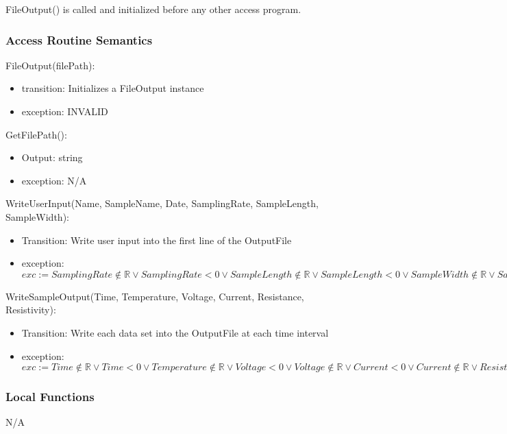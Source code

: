 \documentclass[12pt, titlepage]{article}
\begin{document}
FileOutput() is called and initialized before any other access program. 

\subsubsection{Access Routine Semantics}

\noindent FileOutput(filePath):
\begin{itemize}
\item transition: Initializes a FileOutput instance
\item exception: INVALID
\end{itemize}

\noindent GetFilePath():
\begin{itemize}
\item Output: string
\item exception: N/A
\end{itemize}

\noindent WriteUserInput(Name, SampleName, Date, SamplingRate, SampleLength, SampleWidth):
\begin{itemize}
\item Transition: Write user input into the first line of the OutputFile 
\item exception: $exc:= SamplingRate \notin \mathbb{R} \lor SamplingRate < 0 \lor SampleLength \notin \mathbb{R} \lor SampleLength < 0 \lor SampleWidth \notin \mathbb{R} \lor SampleWidth < 0 \Rightarrow INVALID$
\end{itemize}

\noindent WriteSampleOutput(Time, Temperature, Voltage, Current, Resistance, Resistivity):
\begin{itemize}
\item Transition: Write each data set into the OutputFile at each time interval
\item exception: $exc:= Time \notin  \mathbb{R} \lor Time < 0 \lor  Temperature \notin  \mathbb{R} \lor Voltage < 0 \lor  Voltage \notin  \mathbb{R} \lor Current < 0 \lor  Current \notin  \mathbb{R} \lor Resistance < 0 \lor  Resistance \notin  \mathbb{R} \lor Resistivity < 0\lor  Resistance \notin  \mathbb{R} \lor Resistivity < 0\Rightarrow INVALID$
\end{itemize}

\subsubsection{Local Functions}

N/A
\end{document}
